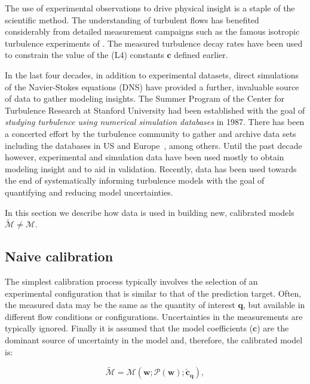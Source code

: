 \documentclass[a4paper]{ar-1col}
\begin{document}
The use of experimental observations to  drive physical insight is a staple of the scientific method.  The understanding of turbulent flows has benefited  
considerably from detailed measurement campaigns such as the famous  isotropic turbulence experiments of \citet{comte1966}. The measured 
turbulence decay rates have been used to constrain the value of the (L4) constants $\mathbf{c}$ defined earlier.

In the last four decades, in addition to experimental datasets, direct simulations of the Navier-Stokes equations (DNS) have provided a further, invaluable source of
data to gather modeling insights. The Summer Program of the Center for Turbulence Research at Stanford University had been established with the  goal of
\emph{studying turbulence using numerical simulation databases} in 1987. There has been a concerted effort by the turbulence community to gather and archive   data sets including the databases in US \citep{l12008} and Europe~\citep{coupland1993}, among others. Until the past decade however,  experimental and simulation data have been used mostly to obtain modeling insight and 
to aid in validation. Recently, data has been used towards the end of systematically informing turbulence models with the goal of quantifying and reducing model uncertainties.





In this section we describe how data   is used in building  new, calibrated models $\widetilde{ \mathcal M} \ne { \mathcal M}$.

\subsection{Naive calibration}
 
The simplest calibration process typically involves the  selection of an experimental configuration that is similar to that of 
the prediction target. Often, the measured data  may be the same as the quantity of interest $ \mathbf{q}$, but available 
  in different flow conditions or configurations. Uncertainties in the measurements are typically ignored. Finally it is assumed that the model coefficients ($\mathbf{c}$)
 are the dominant source of uncertainty in the model and, therefore, the calibrated model is:
 
  \begin{equation}
\widetilde{ \mathcal M} = \mathcal M (   \mathbf{w}; \mathcal P(  \mathbf{w}  );  \tilde{ \mathbf{c}}_\mathbf{q}),    
 \end{equation}
\end{document}
